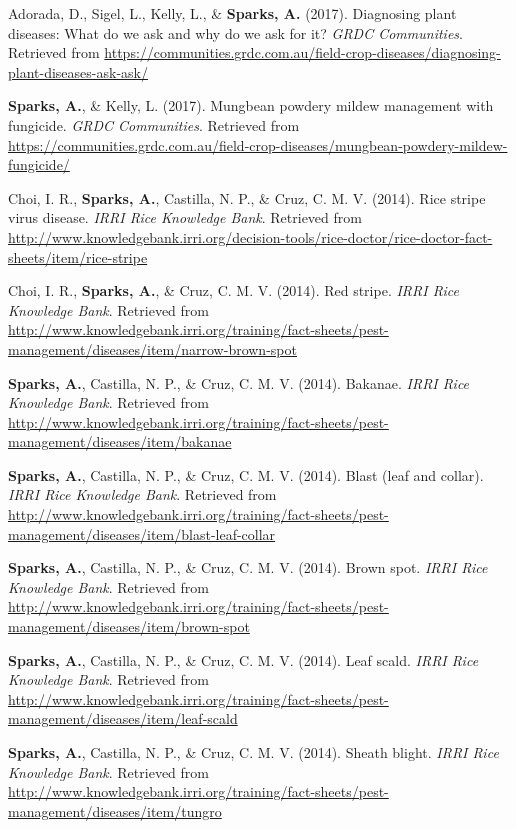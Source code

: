 \documentclass[11pt, a4paper]{awesome-cv}
\begin{document}
\leavevmode\hypertarget{ref-Adorada2017}{}%
Adorada, D., Sigel, L., Kelly, L., \& \textbf{Sparks, A.} (2017). Diagnosing plant diseases: What do we ask and why do we ask for it? \emph{GRDC Communities}. Retrieved from \url{https://communities.grdc.com.au/field-crop-diseases/diagnosing-plant-diseases-ask-ask/}

\leavevmode\hypertarget{ref-Sparks2017}{}%
\textbf{Sparks, A.}, \& Kelly, L. (2017). Mungbean powdery mildew management with fungicide. \emph{GRDC Communities}. Retrieved from \url{https://communities.grdc.com.au/field-crop-diseases/mungbean-powdery-mildew-fungicide/}

\leavevmode\hypertarget{ref-Choi2014b}{}%
Choi, I. R., \textbf{Sparks, A.}, Castilla, N. P., \& Cruz, C. M. V. (2014). Rice stripe virus disease. \emph{IRRI Rice Knowledge Bank}. Retrieved from \url{http://www.knowledgebank.irri.org/decision-tools/rice-doctor/rice-doctor-fact-sheets/item/rice-stripe}

\leavevmode\hypertarget{ref-Choi2014}{}%
Choi, I. R., \textbf{Sparks, A.}, \& Cruz, C. M. V. (2014). Red stripe. \emph{IRRI Rice Knowledge Bank}. Retrieved from \url{http://www.knowledgebank.irri.org/training/fact-sheets/pest-management/diseases/item/narrow-brown-spot}

\leavevmode\hypertarget{ref-Sparks2014}{}%
\textbf{Sparks, A.}, Castilla, N. P., \& Cruz, C. M. V. (2014). Bakanae. \emph{IRRI Rice Knowledge Bank}. Retrieved from \url{http://www.knowledgebank.irri.org/training/fact-sheets/pest-management/diseases/item/bakanae}

\leavevmode\hypertarget{ref-Sparks2014b}{}%
\textbf{Sparks, A.}, Castilla, N. P., \& Cruz, C. M. V. (2014). Blast (leaf and collar). \emph{IRRI Rice Knowledge Bank}. Retrieved from \url{http://www.knowledgebank.irri.org/training/fact-sheets/pest-management/diseases/item/blast-leaf-collar}

\leavevmode\hypertarget{ref-Sparks2014a}{}%
\textbf{Sparks, A.}, Castilla, N. P., \& Cruz, C. M. V. (2014). Brown spot. \emph{IRRI Rice Knowledge Bank}. Retrieved from \url{http://www.knowledgebank.irri.org/training/fact-sheets/pest-management/diseases/item/brown-spot}

\leavevmode\hypertarget{ref-Sparks2014e}{}%
\textbf{Sparks, A.}, Castilla, N. P., \& Cruz, C. M. V. (2014). Leaf scald. \emph{IRRI Rice Knowledge Bank}. Retrieved from \url{http://www.knowledgebank.irri.org/training/fact-sheets/pest-management/diseases/item/leaf-scald}

\leavevmode\hypertarget{ref-Sparks2014c}{}%
\textbf{Sparks, A.}, Castilla, N. P., \& Cruz, C. M. V. (2014). Sheath blight. \emph{IRRI Rice Knowledge Bank}. Retrieved from \url{http://www.knowledgebank.irri.org/training/fact-sheets/pest-management/diseases/item/tungro}
\end{document}
